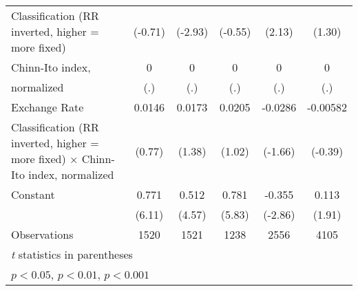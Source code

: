 {\begin{tabular}{l*{5}{c}}
Classification (RR inverted, higher = more fixed)&  (-0.71)         &  (-2.93)         &  (-0.55)         &   (2.13)         &   (1.30)         \\
\addlinespace
Chinn-Ito index,&        0         &        0         &        0         &        0         &        0         \\
normalized      &      (.)         &      (.)         &      (.)         &      (.)         &      (.)         \\
\addlinespace
Exchange Rate   &   0.0146         &   0.0173         &   0.0205         &  -0.0286         & -0.00582         \\
Classification (RR inverted, higher = more fixed) $\times$ Chinn-Ito index, normalized&   (0.77)         &   (1.38)         &   (1.02)         &  (-1.66)         &  (-0.39)         \\
\addlinespace
Constant        &    0.771\sym{***}&    0.512\sym{***}&    0.781\sym{***}&   -0.355\sym{**} &    0.113         \\
                &   (6.11)         &   (4.57)         &   (5.83)         &  (-2.86)         &   (1.91)         \\
\midrule
Observations    &     1520         &     1521         &     1238         &     2556         &     4105         \\
\bottomrule
\multicolumn{6}{l}{\footnotesize \textit{t} statistics in parentheses}\\
\multicolumn{6}{l}{\footnotesize \sym{*} \(p<0.05\), \sym{**} \(p<0.01\), \sym{***} \(p<0.001\)}\\
\end{tabular}
}
